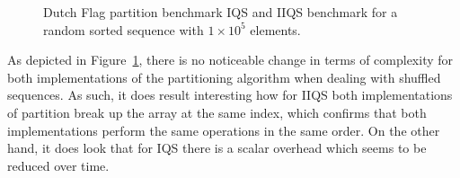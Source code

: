 \begin{figure}
    \caption{Dutch Flag partition benchmark IQS and IIQS benchmark for a random sorted sequence with $1\times10^5$ elements.}
    \label{FIG:PARTITION_SCHEME_01_SHUFFLED}
\end{figure}


As depicted in Figure~\ref{FIG:PARTITION_SCHEME_01_SHUFFLED}, there is no noticeable change in terms of complexity for both implementations of the partitioning algorithm when dealing with shuffled sequences. As such, it does result interesting how for IIQS both implementations of partition break up the array at the same index, which confirms that both implementations perform the same operations in the same order. On the other hand, it does look that for IQS there is a scalar overhead which seems to be reduced over time. \\



